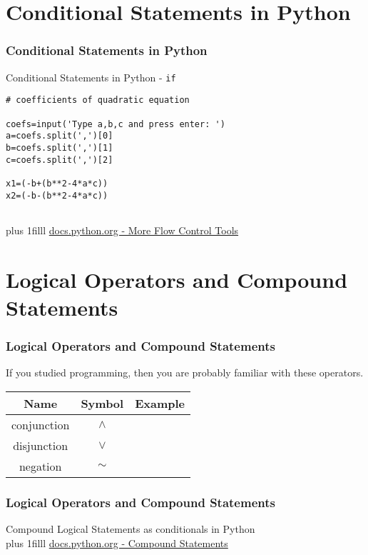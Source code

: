 \documentclass[fleqn]{beamer} %
\newcommand{\sectiontitleIV}{Conditional Statements in Python}
\newcommand{\sectiontitleV}{Logical Operators and Compound Statements}
\newcommand{\btVFill}{\vskip0pt plus 1filll}
\begin{document}
\section{\sectiontitleIV}	
\begin{frame}[label=sectionIV,containsverbatim] \small
\frametitle{\sectiontitleIV}    

Conditional Statements in Python - \lstinline{if}

\begin{lstlisting}
# coefficients of quadratic equation

coefs=input('Type a,b,c and press enter: ')
a=coefs.split(',')[0]
b=coefs.split(',')[1]
c=coefs.split(',')[2]

x1=(-b+(b**2-4*a*c))
x2=(-b-(b**2-4*a*c))


\end{lstlisting}


\btVFill
{\tiny \href{https://docs.python.org/3/tutorial/controlflow.html}{docs.python.org - More Flow Control Tools}}

\end{frame}

\section{\sectiontitleV}	
	\begin{frame}[label=sectionV,containsverbatim] \small
	\frametitle{\sectiontitleV}    
	
	If you studied programming, then you are probably familiar with these operators.  \vspace{5mm}\\
	
	\renewcommand*{\arraystretch}{1.5}
	\begin{tabular}{c|c|c} 
		Name&Symbol&Example\\ \hline
		conjunction&$\wedge$ & \\ \hline
		disjunction&$\vee$ & \\ \hline
		negation&$\sim$& \\ \hline

	\end{tabular}

	\end{frame}
	

	\begin{frame}[label=sectionV,containsverbatim] \small
	\frametitle{\sectiontitleV}    
	
	Compound Logical Statements as conditionals in Python  \vspace{5mm}\\

	\btVFill
	\href{https://docs.python.org/3/reference/compound_stmts.html#}{docs.python.org - Compound Statements}
	\end{frame}
\end{document}
